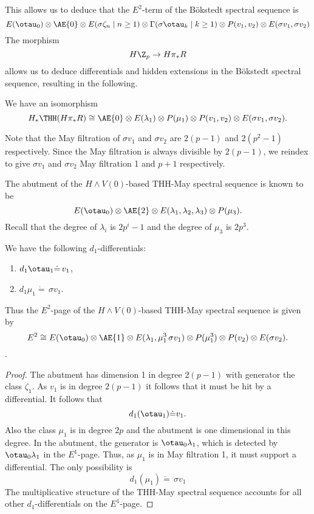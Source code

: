 This allows us to deduce that the $E^2$-term of the B\"okstedt spectral sequence is
\[
E(\otau_0)\otimes \AE{0}\otimes E(\sigma\zeta_n\mid n\geq 1)\otimes \Gamma(\sigma\otau_k\mid k\geq 1)\otimes P(v_1,v_2)\otimes E(\sigma v_1, \sigma v_2)
\]
The morphism 
\[
H\Z_p\to H\pi_*R
\]
allows us to deduce differentials and hidden extensions in the B\"okstedt spectral sequence, resulting in the following. 
\begin{prop} \label{prop:homologyTHH-E0} We have an isomorphism
\[
H_*\THH(H\pi_*R)\cong \AE{0}\otimes E(\lambda_1)\otimes P(\mu_1)\otimes P(v_1,v_2)\otimes E(\sigma v_1,\sigma v_2).
\]
\end{prop}
Note that the May filtration of $\sigma v_1$ and $\sigma v_2$ are $2(p-1)$ and $2(p^2-1)$ respectively. Since the May filtration is always divisible by $2(p-1)$, we reindex to give $\sigma v_1$ and $\sigma v_2$ May filtration 1 and $p+1$ respectively. 

The abutment of the $H\wedge V(0)$-based THH-May spectral sequence is known to be 
\[
E(\otau_0)\otimes \AE{2}\otimes E(\lambda_1, \lambda_2, \lambda_3)\otimes P(\mu_3).
\]
Recall that the degree of $\lambda_i$ is $2p^i-1$ and the degree of $\mu_3$ is $2p^3$.

\begin{prop}
	We have the following $d_1$-differentials:
	\begin{enumerate}
		\item $d_1\otau_1\dot{=}\, v_1$,
		\item $d_1\mu_1\dot{=}\, \sigma v_1$.
	\end{enumerate}
	Thus the $E^2$-page of the $H\wedge V(0)$-based THH-May spectral sequence is given by 
	\[
	E^2\cong E(\otau_0)\otimes \AE{1}\otimes E(\lambda_1, \mu_1^3\, \sigma v_1)\otimes P(\mu_1^3)\otimes P(v_2)\otimes E(\sigma v_2).
	\].
\end{prop}
\begin{proof}
	The abutment has dimension 1 in degree $2(p-1)$ with generator the class $\zeta_1$. As $v_1$ is in degree $2(p-1)$ it follows that it must be hit by a differential. It follows that 
\[
d_1(\otau_1) \dot{=} v_1.
\]
Also the class $\mu_1$ is in degree $2p$ and the abutment is one dimensional in this degree. In the abutment, the generator is $\otau_0\lambda_1$, which is detected by $\otau_0\lambda_1$ in the $E^1$-page. Thus, as $\mu_1$ is in May filtration 1, it must support a differential. The only possibility is 
\[
d_1(\mu_1)\dot{=}\,\sigma v_1
\]
The multiplicative structure of the THH-May spectral sequence accounts for all other $d_1$-differentials on the $E^1$-page.
\end{proof}

